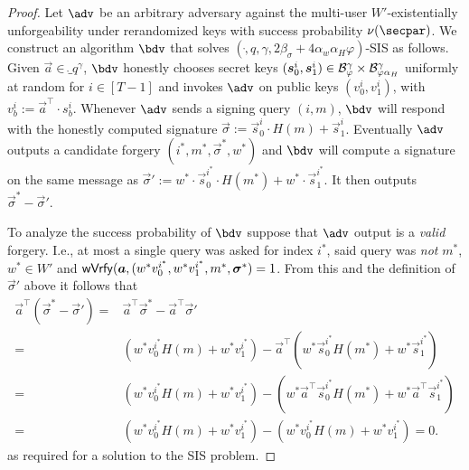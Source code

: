 \begin{proof}
  Let $\adv$ be an arbitrary adversary against the multi-user $W'$-existentially unforgeability under rerandomized keys with success probability $\nu(\secpar)$.
  We construct an algorithm $\bdv$ that solves $(\ring,q,\gamma,2\beta_\sigma + 4\alpha_w\alpha_H\varphi)$-SIS as follows.
  Given $\vec{a}\in\ring_q^\gamma$, $\bdv$ honestly chooses secret keys $(\boldsymbol{s}^i_0,\boldsymbol{s}^i_1) \in \mathcal{B}_{\varphi}^\gamma\times \mathcal{B}_{\varphi\alpha_H}^\gamma$ uniformly at random for $i\in[T-1]$ and invokes $\adv$ on public keys $(v^i_0,v^i_1)$, with $v^i_b := \vec{a}^\intercal\cdot s^i_b$.
  Whenever $\adv$ sends a signing query $(i,m)$, $\bdv$ will respond with the honestly computed signature $\vec{\sigma}:=\vec{s}^i_0\cdot H(m)+ \vec{s}^i_1$.
  Eventually $\adv$ outputs a candidate forgery $(i^*,m^*,\vec{\sigma}^*,w^*)$ and $\bdv$ will compute a signature on the same message as $\vec{\sigma}' := w^*\cdot\vec{s}^{i^*}_0\cdot H(m^*)+ w^*\cdot\vec{s}^{i^*}_1$.
  It then outputs $\vec{\sigma}^*-\vec{\sigma}'$.
  
  To analyze the success probability of $\bdv$ suppose that $\adv$ output is a \emph{valid} forgery.
  I.e., at most a single query was asked for index $i^*$, said query was \emph{not} $m^*$, $w^*\in W'$ and $\mathsf{wVrfy}(\boldsymbol{a},(w^*v^{i^*}_0,w^*v^{i^*}_1,m^*,\boldsymbol{\sigma}^*)=1$.
  From this and the definition of $\vec{\sigma}'$ above it follows that
  \begin{align*}
       \vec{a}^\intercal(\vec{\sigma}^*-\vec{\sigma}') ={}& \vec{a}^\intercal\vec{\sigma}^*-\vec{a}^\intercal\vec{\sigma}'\\ 
    ={}& (w^* v^{i^*}_0 H(m) + w^* v^{i^*}_1) - \vec{a}^\intercal(w^*\vec{s}^{i^*}_0 H(m^*)+ w^*\vec{s}^{i^*}_1)\\
    ={}& (w^* v^{i^*}_0 H(m) + w^* v^{i^*}_1) - (w^*\vec{a}^\intercal\vec{s}^{i^*}_0 H(m^*)+ w^*\vec{a}^\intercal\vec{s}^{i^*}_1)\\
    ={}& (w^* v^{i^*}_0 H(m) + w^* v^{i^*}_1) - (w^* v^{i^*}_0 H(m) + w^* v^{i^*}_1) = 0.
  \end{align*}
  as required for a solution to the SIS problem.
  

\end{proof}
